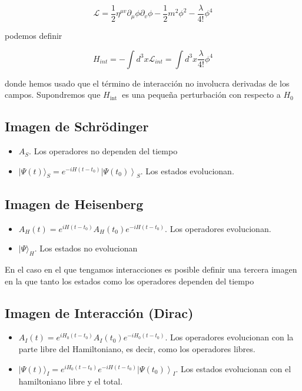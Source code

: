 \begin{equation*}
\mathscr{L}=\frac{1}{2} \eta^{\mu v} \partial_{\mu} \phi \partial_{v} \phi-\frac{1}{2} m^{2} \phi^{2}-\frac{\lambda}{4!} \phi^{4} \tag{7.2}
\end{equation*}

podemos definir

\begin{equation*}
H_{i n t}=-\int d^{3} x \mathscr{L}_{i n t}=\int d^{3} x \frac{\lambda}{4!} \phi^{4} \tag{7.3}
\end{equation*}

donde hemos usado que el término de interacción no involucra derivadas de los campos. Supondremos que $H_{\text {int }}$ es una pequeña perturbación con respecto a $H_{0}$
\subsection{Imagen de Schrödinger}
\begin{itemize}
  \item $A_{S}$. Los operadores no dependen del tiempo
  \item $|\Psi(t)\rangle_{S}=e^{-i H\left(t-t_{0}\right)}\left|\Psi\left(t_{0}\right)\right\rangle_{S}$. Los estados evolucionan.
\end{itemize}
\subsection{Imagen de Heisenberg}
\begin{itemize}
  \item $A_{H}(t)=e^{i H\left(t-t_{0}\right)} A_{H}\left(t_{0}\right) e^{-i H\left(t-t_{0}\right)}$. Los operadores evolucionan.
  \item $|\Psi\rangle_{H}$. Los estados no evolucionan
\end{itemize}

En el caso en el que tengamos interacciones es posible definir una tercera imagen en la que tanto los estados como los operadores dependen del tiempo
\subsection{Imagen de Interacción (Dirac)}
\begin{itemize}
  \item $A_{I}(t)=e^{i H_{0}\left(t-t_{0}\right)} A_{I}\left(t_{0}\right) e^{-i H_{0}\left(t-t_{0}\right)}$. Los operadores evolucionan con la parte libre del Hamiltoniano, es decir, como los operadores libres.
  \item $|\Psi(t)\rangle_{I}=e^{i H_{0}\left(t-t_{0}\right)} e^{-i H\left(t-t_{0}\right)}\left|\Psi\left(t_{0}\right)\right\rangle_{I}$. Los estados evolucionan con el hamiltoniano libre y el total.
\end{itemize}

